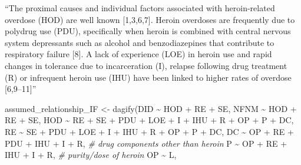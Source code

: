 \documentclass[
]{article}
\newenvironment{Shaded}{\begin{snugshade}}{\end{snugshade}}
\newcommand{\CommentTok}[1]{\textcolor[rgb]{0.56,0.35,0.01}{\textit{#1}}}
\newcommand{\FunctionTok}[1]{\textcolor[rgb]{0.00,0.00,0.00}{#1}}
\newcommand{\NormalTok}[1]{#1}
\newcommand{\OtherTok}[1]{\textcolor[rgb]{0.56,0.35,0.01}{#1}}
\newcommand{\SpecialCharTok}[1]{\textcolor[rgb]{0.00,0.00,0.00}{#1}}
\begin{document}
``The proximal causes and individual factors associated with
heroin-related overdose (HOD) are well known {[}1,3,6,7{]}. Heroin
overdoses are frequently due to polydrug use (PDU), specifically when
heroin is combined with central nervous system depressants such as
alcohol and benzodiazepines that contribute to respiratory failure
{[}8{]}. A lack of experience (LOE) in heroin use and rapid changes in
tolerance due to incarceration (I), relapse following drug treatment (R)
or infrequent heroin use (IHU) have been linked to higher rates of
overdose {[}6,9--11{]}''

\begin{Shaded}
\begin{Highlighting}[]
\NormalTok{assumed\_relationship\_IF }\OtherTok{\textless{}{-}} \FunctionTok{dagify}\NormalTok{(DID }\SpecialCharTok{\textasciitilde{}}\NormalTok{ HOD }\SpecialCharTok{+}\NormalTok{ RE }\SpecialCharTok{+}\NormalTok{ SE,}
\NormalTok{                                          NFNM }\SpecialCharTok{\textasciitilde{}}\NormalTok{ HOD }\SpecialCharTok{+}\NormalTok{ RE }\SpecialCharTok{+}\NormalTok{ SE,}
\NormalTok{                                          HOD }\SpecialCharTok{\textasciitilde{}}\NormalTok{ RE }\SpecialCharTok{+}\NormalTok{ SE }\SpecialCharTok{+}\NormalTok{ PDU }\SpecialCharTok{+}\NormalTok{ LOE }\SpecialCharTok{+}\NormalTok{ I }\SpecialCharTok{+}\NormalTok{ IHU }\SpecialCharTok{+}\NormalTok{ R }\SpecialCharTok{+}\NormalTok{ OP }\SpecialCharTok{+}\NormalTok{ P }\SpecialCharTok{+}\NormalTok{ DC,}
\NormalTok{                                          RE }\SpecialCharTok{\textasciitilde{}}\NormalTok{ SE }\SpecialCharTok{+}\NormalTok{ PDU }\SpecialCharTok{+}\NormalTok{ LOE }\SpecialCharTok{+}\NormalTok{ I }\SpecialCharTok{+}\NormalTok{ IHU }\SpecialCharTok{+}\NormalTok{ R }\SpecialCharTok{+}\NormalTok{ OP }\SpecialCharTok{+}\NormalTok{ P }\SpecialCharTok{+}\NormalTok{ DC,}
\NormalTok{                                          DC }\SpecialCharTok{\textasciitilde{}}\NormalTok{ OP }\SpecialCharTok{+}\NormalTok{ RE }\SpecialCharTok{+}\NormalTok{ PDU }\SpecialCharTok{+}\NormalTok{ IHU }\SpecialCharTok{+}\NormalTok{ I }\SpecialCharTok{+}\NormalTok{ R, }\CommentTok{\# drug components other than heroin}
\NormalTok{                                          P }\SpecialCharTok{\textasciitilde{}}\NormalTok{ OP }\SpecialCharTok{+}\NormalTok{ RE }\SpecialCharTok{+}\NormalTok{ IHU }\SpecialCharTok{+}\NormalTok{ I }\SpecialCharTok{+}\NormalTok{ R, }\CommentTok{\# purity/dose of heroin}
\NormalTok{                                          OP }\SpecialCharTok{\textasciitilde{}}\NormalTok{ L,}

\end{Highlighting}
\end{Shaded}
\end{document}
